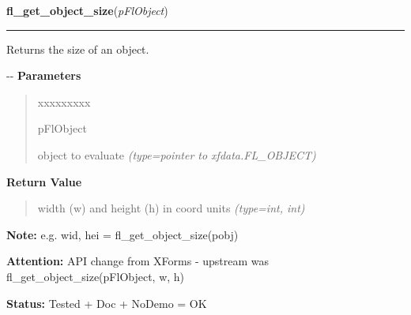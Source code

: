 \hspace{.8\funcindent}\begin{boxedminipage}{\funcwidth}

    \raggedright \textbf{fl\_get\_object\_size}(\textit{pFlObject})

    \vspace{-1.5ex}

    \rule{\textwidth}{0.5\fboxrule}
\setlength{\parskip}{2ex}

Returns the size of an object.

-{}-
\setlength{\parskip}{1ex}
      \textbf{Parameters}
      \vspace{-1ex}

      \begin{quote}
        \begin{Ventry}{xxxxxxxxx}

          \item[pFlObject]


object to evaluate
            {\it (type=pointer to xfdata.FL\_OBJECT)}

        \end{Ventry}

      \end{quote}

      \textbf{Return Value}
    \vspace{-1ex}

      \begin{quote}

width (w) and height (h) in coord units
      {\it (type=int, int)}

      \end{quote}

\textbf{Note:} 
e.g. wid, hei = fl\_get\_object\_size(pobj)


\textbf{Attention:} 
API change from XForms - upstream was
fl\_get\_object\_size(pFlObject, w, h)


\textbf{Status:} 
Tested + Doc + NoDemo = OK


    \end{boxedminipage}

    \label{xformslib:flbasic:fl_set_object_size}

    \vspace{0.5ex}

